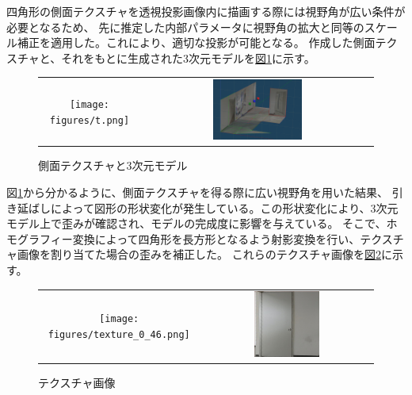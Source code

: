 \documentclass[]{jarticle}          %
\begin{document}
四角形の側面テクスチャを透視投影画像内に描画する際には視野角が広い条件が必要となるため、
先に推定した内部パラメータに視野角の拡大と同等のスケール補正を適用した。これにより、適切な投影が可能となる。
作成した側面テクスチャと、それをもとに生成された3次元モデルを\hyperref[one]{図\ref{one}}に示す。
\begin{figure}[H]
  \begin{center}
    \begin{tabular}{cc}
      \texttt{[image: figures/t.png]}&
      \includegraphics[width=0.4\textwidth]{figures/3dmodel_1.png}
    \end{tabular}
  \end{center}
  \caption{側面テクスチャと3次元モデル}
  \label{one}
\end{figure}
図\ref{one}から分かるように、側面テクスチャを得る際に広い視野角を用いた結果、
引き延ばしによって図形の形状変化が発生している。この形状変化により、3次元モデル上で歪みが確認され、モデルの完成度に影響を与えている。
そこで、ホモグラフィー変換によって四角形を長方形となるよう射影変換を行い、テクスチャ画像を割り当てた場合の歪みを補正した。
これらのテクスチャ画像を\hyperref[two]{図\ref{two}}に示す。

\begin{figure}[H]
  \begin{center}
    \begin{tabular}{cc}
      \texttt{[image: figures/texture\_0\_46.png]}&
      \includegraphics[width=0.4\textwidth]{figures/texture_2_54.png}\\
    \end{tabular}
  \end{center}
  \caption{テクスチャ画像}
  \label{two}
\end{figure}
\end{document}
